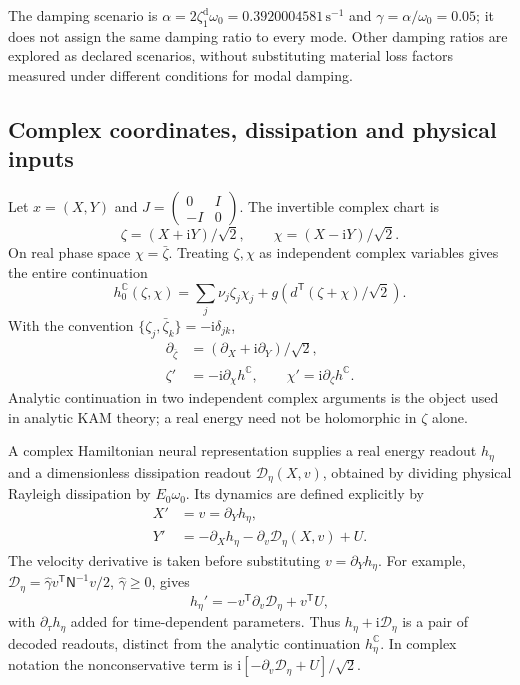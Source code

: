 The damping scenario is
$\alpha=2\zeta_1^{\mathrm{d}}\omega_0=0.3920004581\,\mathrm{s^{-1}}$ and
$\gamma=\alpha/\omega_0=0.05$; it does not assign the same damping ratio
to every mode. Other damping ratios are explored as declared scenarios,
without substituting material loss factors measured under different
conditions for modal damping.

\subsection{Complex coordinates, dissipation and physical inputs}
\label{mech:complex}
Let $x=(X,Y)$ and $J=\left(\begin{smallmatrix}0&I\\-I&0\end{smallmatrix}\right)$.
The invertible complex chart is
\begin{equation}
 \zeta=(X+\mathrm iY)/\sqrt2,\qquad
 \chi=(X-\mathrm iY)/\sqrt2.
 \label{mech:complex-chart}
\end{equation}
On real phase space $\chi=\bar\zeta$. Treating $\zeta,\chi$ as
independent complex variables gives the entire continuation
\begin{equation}
 h_0^{\mathbb C}(\zeta,\chi)
 =\sum_j\nu_j\zeta_j\chi_j
       +g\!\left(d^{\mathsf T}(\zeta+\chi)/\sqrt2\right).
 \label{mech:complex-energy}
\end{equation}
With the convention
$\{\zeta_j,\bar\zeta_k\}=-\mathrm i\delta_{jk}$,
\begin{align}
 \partial_{\bar\zeta}&=(\partial_X+\mathrm i\partial_Y)/\sqrt2,\nonumber\\
 \zeta'&=-\mathrm i\partial_\chi h^{\mathbb C},\qquad
 \chi'=\mathrm i\partial_\zeta h^{\mathbb C}.
 \label{mech:wirtinger}
\end{align}
Analytic continuation in two independent complex arguments is the object
used in analytic KAM theory; a real energy need not be holomorphic in
$\zeta$ alone.

A complex Hamiltonian neural representation supplies a real energy
readout $h_\eta$ and a dimensionless dissipation readout
$\mathcal D_\eta(X,v)$, obtained by dividing physical Rayleigh
dissipation by $E_0\omega_0$. Its dynamics are defined explicitly by
\begin{align}
 X'&=v=\partial_Yh_\eta,\nonumber\\
 Y'&=-\partial_Xh_\eta-\partial_v\mathcal D_\eta(X,v)+U.
 \label{mech:decoder}
\end{align}
The velocity derivative is taken before substituting
$v=\partial_Yh_\eta$. For example,
$\mathcal D_\eta=\widehat\gamma v^{\mathsf T}\mathsf N^{-1}v/2$,
$\widehat\gamma\ge0$, gives
\begin{equation}
 h_\eta'=-v^{\mathsf T}\partial_v\mathcal D_\eta+v^{\mathsf T}U,
 \label{mech:power}
\end{equation}
with $\partial_\tau h_\eta$ added for time-dependent parameters.
Thus $h_\eta+\mathrm i\mathcal D_\eta$ is a pair of decoded readouts,
distinct from the analytic continuation $h_\eta^{\mathbb C}$.
In complex notation the nonconservative term is
$\mathrm i[-\partial_v\mathcal D_\eta+U]/\sqrt2$.


